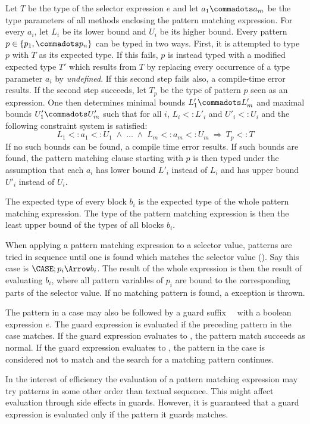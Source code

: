 Let $T$ be the type of the selector expression $e$ and let $a_1
\commadots a_m$ be the type parameters of all methods enclosing 
the pattern matching expression.  For every $a_i$, let $L_i$ be its
lower bound and $U_i$ be its higher bound.  Every pattern $p \in
\{p_1, \commadots p_n\}$ can be typed in two ways. First, it is attempted
to type $p$ with $T$ as its expected type. If this fails, $p$ is
instead typed with a modified expected type $T'$ which results from
$T$ by replacing every occurrence of a type parameter $a_i$ by
\mbox{\sl undefined}.  If this second step fails also, a compile-time
error results. If the second step succeeds, let $T_p$ be the type of
pattern $p$ seen as an expression. One then determines minimal bounds
$L'_1 \commadots L'_m$ and maximal bounds $U'_1 \commadots U'_m$ such
that for all $i$, $L_i <: L'_i$ and $U'_i <: U_i$ and the following
constraint system is satisfied:
\[
    L_1 <: a_1 <: U_1\;\wedge\;\ldots\;\wedge\;L_m <: a_m <: U_m 
    \ \Rightarrow\ T_p <: T
\]
If no such bounds can be found, a compile time error results.  If such
bounds are found, the pattern matching clause starting with $p$ is
then typed under the assumption that each $a_i$ has lower bound $L'_i$
instead of $L_i$ and has upper bound $U'_i$ instead of $U_i$.

The expected type of every block $b_i$ is the expected type of the
whole pattern matching expression.  The type of the pattern matching
expression is then the least upper bound of the types of all blocks
$b_i$.

When applying a pattern matching expression to a selector value,
patterns are tried in sequence until one is found which matches the
selector value (). Say this case is $\CASE;p_i
\Arrow b_i$.  The result of the whole expression is then the result of
evaluating $b_i$, where all pattern variables of $p_i$ are bound to
the corresponding parts of the selector value.  If no matching pattern
is found, a  exception is thrown.

The pattern in a case may also be followed by a guard suffix \ \ 
with a boolean expression $e$.  The guard expression is evaluated if
the preceding pattern in the case matches. If the guard expression
evaluates to \code{true}, the pattern match succeeds as normal. If the
guard expression evaluates to \code{false}, the pattern in the case
is considered not to match and the search for a matching pattern
continues.

In the interest of efficiency the evaluation of a pattern matching
expression may try patterns in some other order than textual
sequence. This might affect evaluation through
side effects in guards. However, it is guaranteed that a guard
expression is evaluated only if the pattern it guards matches.

